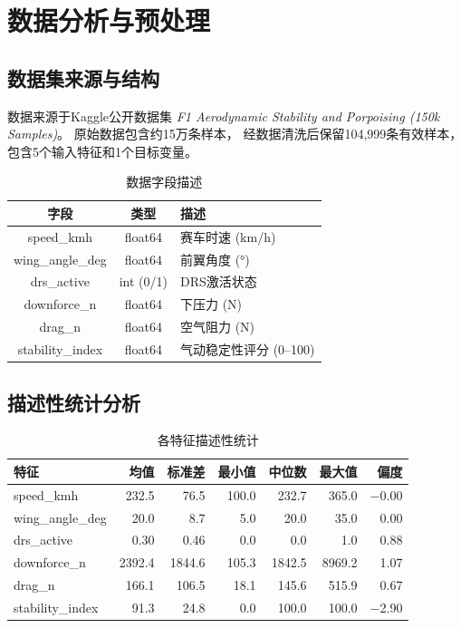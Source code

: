 \section{数据分析与预处理}

\subsection{数据集来源与结构}

数据来源于Kaggle公开数据集
\emph{F1 Aerodynamic Stability and Porpoising (150k Samples)}。
原始数据包含约15万条样本，
经数据清洗后保留104,999条有效样本，
包含5个输入特征和1个目标变量。

\begin{table}[H]
\centering
\caption{数据字段描述}
\begin{tabular}{ccl}
\toprule
字段 & 类型 & 描述 \\
\midrule
speed\_kmh & float64 & 赛车时速 (km/h) \\
wing\_angle\_deg & float64 & 前翼角度 (°) \\
drs\_active & int (0/1) & DRS激活状态 \\
downforce\_n & float64 & 下压力 (N) \\
drag\_n & float64 & 空气阻力 (N) \\
stability\_index & float64 & 气动稳定性评分 (0--100) \\
\bottomrule
\end{tabular}
\end{table}

\subsection{描述性统计分析}

\begin{table}[H]
\centering
\caption{各特征描述性统计}
\begin{tabular}{lrrrrrr}
\toprule
特征 & 均值 & 标准差 & 最小值 & 中位数 & 最大值 & 偏度 \\
\midrule
speed\_kmh & 232.5 & 76.5 & 100.0 & 232.7 & 365.0 & $-$0.00 \\
wing\_angle\_deg & 20.0 & 8.7 & 5.0 & 20.0 & 35.0 & 0.00 \\
drs\_active & 0.30 & 0.46 & 0.0 & 0.0 & 1.0 & 0.88 \\
downforce\_n & 2392.4 & 1844.6 & 105.3 & 1842.5 & 8969.2 & 1.07 \\
drag\_n & 166.1 & 106.5 & 18.1 & 145.6 & 515.9 & 0.67 \\
stability\_index & 91.3 & 24.8 & 0.0 & 100.0 & 100.0 & $-$2.90 \\
\bottomrule
\end{tabular}
\end{table}


